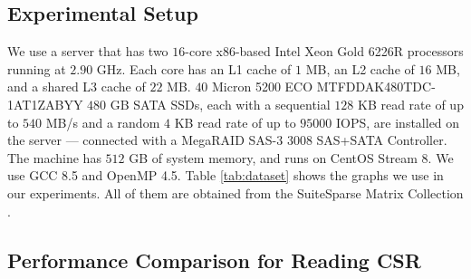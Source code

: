 \subsection{Experimental Setup}
\label{sec:setup}

We use a server that has two $16$-core x86-based Intel Xeon Gold 6226R processors running at $2.90$ GHz. Each core has an L1 cache of $1$ MB, an L2 cache of $16$ MB, and a shared L3 cache of $22$ MB. $40$ Micron 5200 ECO MTFDDAK480TDC-1AT1ZABYY $480$ GB SATA SSDs, each with a sequential $128$ KB read rate of up to $540$ MB/s and a random $4$ KB read rate of up to $95000$ IOPS, are installed on the server --- connected with a MegaRAID SAS-3 3008 SAS+SATA Controller. The machine has $512$ GB of system memory, and runs on CentOS Stream 8. We use GCC 8.5 and OpenMP 4.5. Table \ref{tab:dataset} shows the graphs we use in our experiments. All of them are obtained from the SuiteSparse Matrix Collection \cite{kolodziej2019suitesparse}.






\subsection{Performance Comparison for Reading CSR}

